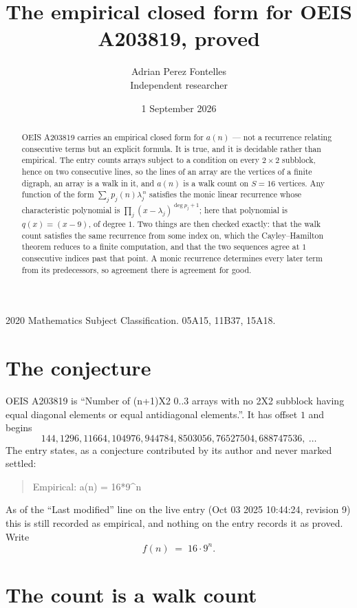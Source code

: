 \documentclass[11pt,a4paper]{article}
\title{The empirical closed form for OEIS A203819, proved}
\author{Adrian Perez Fontelles\\ \small Independent researcher}
\date{1 September 2026}
\theoremstyle{plain}
\theoremstyle{definition}
\begin{document}
\maketitle

\begin{abstract}
OEIS A203819 carries an empirical closed form for $a(n)$ --- not a recurrence relating
consecutive terms but an explicit formula. It is true, and it is decidable rather than
empirical. The entry counts arrays subject to a condition on every $2\times2$ subblock, hence on two consecutive lines, so the lines of an array are the
vertices of a finite digraph, an array is a walk in it, and $a(n)$ is a walk count on
$S=16$ vertices. Any function of the form $\sum_j p_j(n)\lambda_j^{\,n}$ satisfies the
monic linear recurrence whose characteristic polynomial is
$\prod_j(x-\lambda_j)^{\deg p_j+1}$; here that polynomial is $q(x)=(x-9)$, of degree
$1$. Two things are then checked exactly: that the walk count satisfies the same
recurrence from some index on, which the Cayley--Hamilton theorem reduces to a finite
computation, and that the two sequences agree at $1$ consecutive indices past that
point. A monic recurrence determines every later term from its predecessors, so agreement
there is agreement for good.
\end{abstract}

\noindent\small 2020 Mathematics Subject Classification. 05A15, 11B37, 15A18.\normalsize

\section{The conjecture}

OEIS A203819 is ``Number of (n+1)X2 0..3 arrays with no 2X2 subblock having equal diagonal elements or equal antidiagonal elements.''. It has offset $1$ and begins
\[
144, 1296, 11664, 104976, 944784, 8503056, 76527504, 688747536,\ \dots
\]
The entry states, as a conjecture contributed by its author and never marked settled:
\begin{quote}
Empirical: a(n) = 16*9\^{}n
\end{quote}
As of the ``Last modified'' line on the live entry (Oct 03 2025 10:44:24, revision 9) this is still
recorded as empirical, and nothing on the entry records it as proved. Write
\[
f(n)\;=\;16 \cdot 9^{n}.
\]

\section{The count is a walk count}
\end{document}
